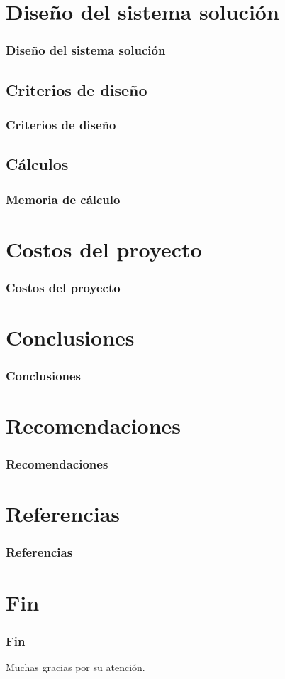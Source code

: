 \documentclass[dvipsnames]{beamer}
\begin{document}
 

 	\section[Diseño]{Diseño del sistema solución}
	\begin{frame}
		\frametitle{Diseño del sistema solución}
		
	\end{frame}
	
	\subsection{Criterios de diseño}
\begin{frame}
	\frametitle{Criterios de diseño}
	
\end{frame}



	\subsection[Cálculos]{Cálculos}
	\begin{frame}
		\frametitle{Memoria de cálculo}
		
	\end{frame}
	

	\section[Costos]{Costos del proyecto}
	\begin{frame}
		\frametitle{Costos del proyecto}
		
	\end{frame}

	\section[Conclusión]{Conclusiones}
	\begin{frame}
		\frametitle{Conclusiones}
		
	\end{frame}
	

	\section{Recomendaciones}
	\begin{frame}
		\frametitle{Recomendaciones}
		
	\end{frame}

	\section{Referencias}
	\begin{frame}
		\frametitle{Referencias}
		
	\end{frame}
	

	\section{Fin}
	\begin{frame}
		\frametitle{Fin}
		Muchas gracias por su atención.
	\end{frame}
	
\end{document}
